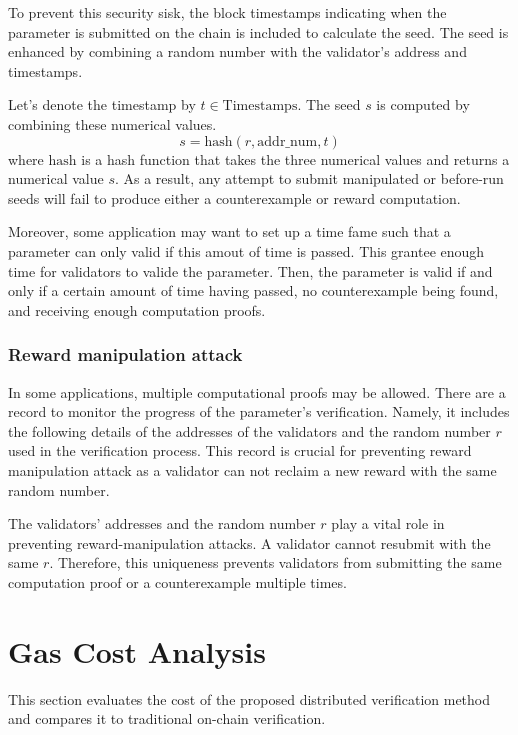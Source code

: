 \documentclass[runningheads]{llncs}
\begin{document}
To prevent this security sisk, the block timestamps indicating when the parameter is submitted on the chain is included to calculate the seed. The seed is enhanced by combining a random number with the validator's address and timestamps.

 Let's denote the timestamp by \( t \in \text{Timestamps}\). The seed $s$ is computed by combining these numerical values.
\begin{equation}
s = \text{hash}(r, \text{addr\_num}, t)
\end{equation}
where \(\text{hash}\) is a hash function that takes the three numerical values and returns a numerical value \( s \).
As a result, any attempt to submit manipulated or before-run seeds will fail to produce either a counterexample or reward computation.

Moreover, some application may want to set up a time fame such that a parameter can only valid if this amout of time is passed. This grantee enough time for validators to valide the parameter. Then, the parameter is valid if and only if a certain amount of time having passed, no counterexample being found, and receiving enough computation proofs. 
\subsubsection{Reward manipulation attack}
In some applications, multiple computational proofs may be allowed. There are a record to monitor the progress of the parameter's verification. Namely, it includes the following details of the addresses of the validators and the random number $r$ used in the verification process. This record is crucial for preventing reward manipulation attack as a validator can not reclaim a new reward with the same random number. 

The validators' addresses and the random number $r$ play a vital role in preventing reward-manipulation attacks. A validator cannot resubmit with the same $r$. Therefore, this uniqueness prevents validators from submitting the same computation proof or a counterexample multiple times.
\section{Gas Cost Analysis}
\label{sec:gas-cost-analysis}
This section evaluates the cost of the proposed distributed verification method and compares it to traditional on-chain verification.
\end{document}
